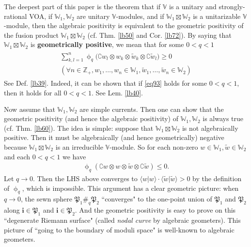 \documentclass[11pt,b5paper,notitlepage]{article}
\theoremstyle{definition}
\theoremstyle{plain}
\newcommand{\fk}{\mathfrak}
\newcommand{\wtd}{\widetilde}
\newcommand{\bk}[1]{\langle {#1}\rangle}
\newcommand{\im}{\mathbf{i}}
\newcommand{\Co}{\complement}
\newcommand{\Vbb}{\mathbb V}
\newcommand{\Wbb}{\mathbb W}
\newcommand{\Zbb}{\mathbb Z}
\numberwithin{equation}{section}
\begin{document}
The deepest part of this paper is the theorem that if $\Vbb$ is a unitary and strongly-rational VOA, if $\Wbb_1,\Wbb_2$ are unitary $\Vbb$-modules, and if $\Wbb_1\boxtimes\Wbb_2$ is a unitarizable $\Vbb$-module, then the algebraic positivity is equivalent to the geometric positivity of the fusion product $\Wbb_1\boxtimes\Wbb_2$  (cf. Thm. \ref{lb50} and Cor. \ref{lb72}). By saying that $\Wbb_1\boxtimes\Wbb_2$ is \textbf{geometrically positive}, we mean that for some $0<q<1$
\begin{gather}\label{eq93}
\begin{gathered}
\sum_{k,l=1}^n\upphi_q\big(\Co w_l\otimes  w_k\otimes  \wtd w_k \otimes \Co\wtd w_l\big)\geq0\\
(\forall n\in\Zbb_+, w_1,\dots,w_n\in\Wbb_1,\wtd w_1,\dots,\wtd w_n\in\Wbb_2) 
\end{gathered}
\end{gather}
See Def. \ref{lb39}. Indeed, it can be shown that if \eqref{eq93} holds for some $0<q<1$, then it holds for all $0<q<1$. See Lem. \ref{lb40}.

Now assume that $\Wbb_1,\Wbb_2$ are simple currents. Then one can show that the geometric positivity (and hence the algebraic positivity) of $\Wbb_1,\Wbb_2$ is always true (cf. Thm. \ref{lb60}). The idea is simple: suppose that $\Wbb_1\boxtimes\Wbb_2$ is not algebraically positive. Then it must be algebraically (and hence geometrically) negative because $\Wbb_1\boxtimes\Wbb_2$ is an irreducible $\Vbb$-module. So for each non-zero $w\in\Wbb_1,\wtd w\in\Wbb_2$ and each $0<q<1$ we have
\begin{align*}
\upphi_q(\Co w\otimes w\otimes\wtd w\otimes\Co \wtd w)\leq 0.
\end{align*}
Let $q\rightarrow0$. Then the LHS above converges to $\bk{w|w}\cdot \bk{\wtd w|\wtd w}>0$ by the definition of $\upphi_q$, which is impossible. This argument has a clear geometric picture: when $q\rightarrow0$, the sewn sphere $\fk P_1\#_q\fk P_2$ ``converges" to the one-point union of $\fk P_1$ and $\fk P_2$ along $\im\in\fk P_1$ and $\im\in\fk P_2$. And the geometric positivity is easy to prove on this ``degenerate Riemann surface" (called \emph{nodal curve} by algebraic geometers). This picture of ``going to the boundary of moduli space" is well-known to algebraic geometers.
\end{document}
